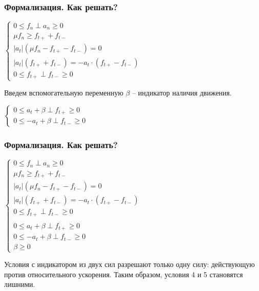 \documentclass{beamer}
\begin{document}
\begin{frame}[t]
\frametitle{Формализация. Как решать?}
    \small \bigskip \bigskip \medskip
    $
    \begin{cases}
        0 \le f_n \perp a_n \ge 0 \\
        \mu f_n \ge f_{t+} + f_{t-} \\
        |a_t| (\mu f_n - f_{t+} - f_{t-}) = 0 \\
        |a_t| (f_{t+} + f_{t-}) = -a_t \cdot (f_{t+} - f_{t-}) \\
        0 \le f_{t+} \perp f_{t-} \ge 0
    \end{cases}
    $

    \bigskip
    Введем вспомогательную переменную $\beta$ -- индикатор наличия движения.

    \medskip
    $
    \begin{cases}
        0 \le a_t + \beta \perp f_{t+} \ge 0 \\
        0 \le -a_t + \beta \perp f_{t-} \ge 0
    \end{cases}
    $

\end{frame}


\begin{frame}[t]
\frametitle{Формализация. Как решать?}
    \small \bigskip \bigskip \medskip
    $
    \begin{cases}
        0 \le f_n \perp a_n \ge 0 \\
        \mu f_n \ge f_{t+} + f_{t-} \\
        |a_t| (\mu f_n - f_{t+} - f_{t-}) = 0 \\
        |a_t| (f_{t+} + f_{t-}) = -a_t \cdot (f_{t+} - f_{t-}) \\
        0 \le f_{t+} \perp f_{t-} \ge 0 \\
        \\
        0 \le a_t + \beta \perp f_{t+} \ge 0 \\
        0 \le -a_t + \beta \perp f_{t-} \ge 0 \\
        \beta \ge 0
    \end{cases}
    $

    \bigskip
    Условия с индикатором из двух сил разрешают только одну силу: действующую против относительного ускорения. Таким образом, условия 4 и 5 становятся лишними.

\end{frame}
\end{document}
